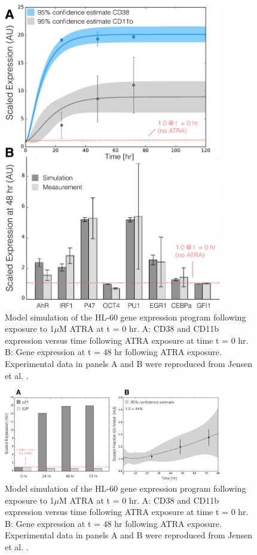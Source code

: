 \documentclass[12pt]{article}
\begin{document}
\begin{figure}[!t]\centering
\includegraphics[width=0.85\textwidth]{./figs/Fig-4-GRN-Simulations.pdf}
\caption{Model simulation of the HL-60 gene expression program following exposure to 1$\mu$M ATRA at t = 0 hr.
A: CD38 and CD11b expression versus time following ATRA exposure at time t = 0 hr.
B: Gene expression at t = 48 hr following ATRA exposure.
Experimental data in panels A and B were reproduced from Jensen et al. \cite{Jensen:2015aa}.}\label{fig:model-grn-simulations}
\end{figure}

\begin{figure}[!t]\centering
\includegraphics[width=0.85\textwidth]{./figs/Fig-5-GRN-CellCycle-Predictions.pdf}
\caption{Model simulation of the HL-60 gene expression program following exposure to 1$\mu$M ATRA at t = 0 hr.
A: CD38 and CD11b expression versus time following ATRA exposure at time t = 0 hr.
B: Gene expression at t = 48 hr following ATRA exposure.
Experimental data in panels A and B were reproduced from Jensen et al. \cite{Jensen:2015aa}.}\label{fig:model-grn-simulations}
\end{figure}
\end{document}
